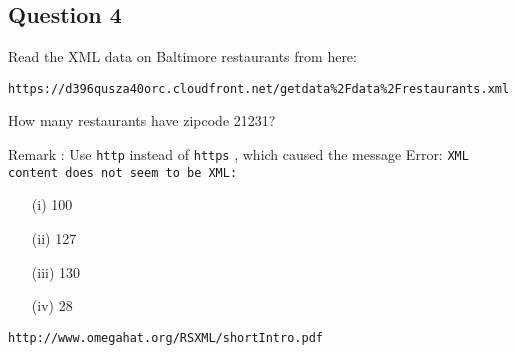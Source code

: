 \documentclass[]{article}
\begin{document}
\subsection*{Question 4}

Read the XML data on Baltimore restaurants from here: 

\begin{verbatim}
https://d396qusza40orc.cloudfront.net/getdata%2Fdata%2Frestaurants.xml 
\end{verbatim}
How many restaurants have zipcode 21231? 

Remark : Use \texttt{http}  instead of \texttt{https} , which caused the message Error: \texttt{XML content does not 
seem to be XML: }
\begin{itemize}
\item[(i)] 100 

\item[(ii)] 127 

\item[(iii)] 130 

\item[(iv)] 28
\end{itemize}

\begin{verbatim}
http://www.omegahat.org/RSXML/shortIntro.pdf
\end{verbatim}
\end{document}
